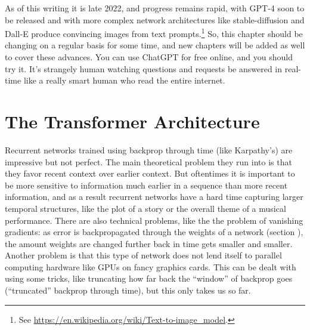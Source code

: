 As of this writing it is late 2022, and progress remains rapid, with GPT-4 soon to be released and with more complex network architectures like stable-diffusion and Dall-E produce convincing images from text prompts.\footnote{See \url{https://en.wikipedia.org/wiki/Text-to-image_model}.} So, this chapter should be changing on a regular basis for some time, and new chapters will be added as well to cover these advances. You can use ChatGPT for free online, and you should try it. It's strangely human watching questions and requests be answered in real-time like a really smart human who read the entire internet.


\section{The Transformer Architecture}



Recurrent networks trained using backprop through time (like Karpathy's) are impressive but not perfect. The main theoretical problem they run into is that they favor recent context over earlier context.  But oftentimes it is important to be more sensitive to information much earlier in a sequence than more recent information, and as a result recurrent networks have a hard time capturing larger temporal structures,  like the plot of a story or the overall theme of a musical performance. There are also technical problems, like the the problem of vanishing gradients: as error is backpropagated through the weights of a network (section ), the amount weights are changed further back in time gets smaller and smaller. Another problem is that this type of network does not lend itself to parallel computing hardware like GPUs on fancy graphics cards. This can be dealt with using some tricks, like truncating how far back the ``window'' of backprop goes (``truncated'' backprop through time), but this only takes us so far.

